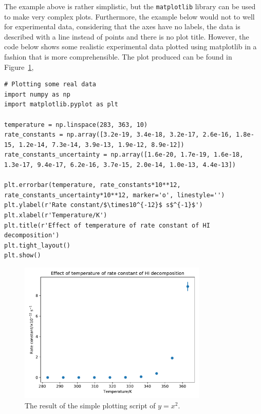 \documentclass[a4paper]{article}
\begin{document}
The example above is rather simplistic, but the \texttt{matplotlib} library can be used to make very complex plots.
Furthermore, the example below would not to well for experimental data, considering that the axes have no labels, the data is described with a line instead of points and there is no plot title.
However, the code below shows some realistic experimental data plotted using matplotlib in a fashion that is more comprehensible.
The plot produced can be found in Figure~\ref{fig:real},
\begin{lstlisting}
# Plotting some real data
import numpy as np
import matplotlib.pyplot as plt

temperature = np.linspace(283, 363, 10)
rate_constants = np.array([3.2e-19, 3.4e-18, 3.2e-17, 2.6e-16, 1.8e-15, 1.2e-14, 7.3e-14, 3.9e-13, 1.9e-12, 8.9e-12])
rate_constants_uncertainty = np.array([1.6e-20, 1.7e-19, 1.6e-18, 1.3e-17, 9.4e-17, 6.2e-16, 3.7e-15, 2.0e-14, 1.0e-13, 4.4e-13])

plt.errorbar(temperature, rate_constants*10**12, rate_constants_uncertainty*10**12, marker='o', linestyle='')
plt.ylabel(r'Rate constant/$\times10^{-12}$ s$^{-1}$')
plt.xlabel(r'Temperature/K')
plt.title(r'Effect of temperature of rate constant of HI decomposition')
plt.tight_layout()
plt.show()
\end{lstlisting}
%
\begin{figure}[t]
\centering
\includegraphics[width=0.8\textwidth]{real}
\caption{\label{fig:real} The result of the simple plotting script of $y = x ^ 2$.}
\end{figure}
%
\vspace{\baselineskip}
\begin{center}
	\noindent{}
\end{center}
\end{document}
